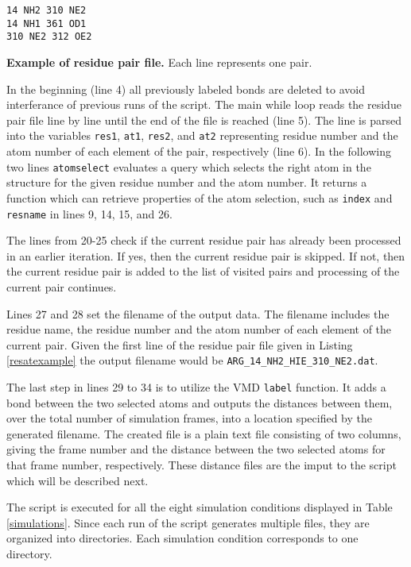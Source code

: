 \documentclass[11pt,twocolumn]{article}
\begin{document}
\begin{listing}
\begin{verbatim}
14 NH2 310 NE2
14 NH1 361 OD1
310 NE2 312 OE2
\end{verbatim}
\caption{\textbf{Example of residue pair file.} Each line represents one pair.}\label{resatexample}
\end{listing}

In the beginning (line 4) all previously labeled bonds are deleted to avoid interferance of previous runs of the script.
The main while loop reads the residue pair file line by line until the end of the file is reached (line 5). The line is parsed into the variables \texttt{res1}, \texttt{at1}, \texttt{res2}, and \texttt{at2} representing residue number and the atom number of each element of the pair, respectively (line 6).
In the following two lines \texttt{atomselect} evaluates a query which selects the right atom in the structure for the given residue number and the atom number. It returns a function which can retrieve properties of the atom selection, such as \texttt{index} and \texttt{resname} in lines 9, 14, 15, and 26.

The lines from 20-25 check if the current residue pair has already been processed in an earlier iteration. If yes, then the current residue pair is skipped. If not, then the current residue pair is added to the list of visited pairs and processing of the current pair continues.  

Lines 27 and 28 set the filename of the output data. The filename includes the residue name, the residue number and the atom number of each element of the current pair. Given the first line of the residue pair file given in Listing \ref{resatexample} the output filename would be \texttt{ARG\_14\_NH2\_HIE\_310\_NE2.dat}.

The last step in lines 29 to 34 is to utilize the VMD \texttt{label} function. It adds a bond between the two selected atoms and outputs the distances between them, over the total number of simulation frames, into a location specified by the generated filename. The created file is a plain text file consisting of two columns, giving the frame number and the distance between the two selected atoms for that frame number, respectively. These distance files are the imput to the script which will be described next.

The script is executed for all the eight simulation conditions displayed in Table \ref{simulations}. Since each run of the script generates multiple files, they are organized into directories. Each simulation condition corresponds to one directory.
\end{document}
